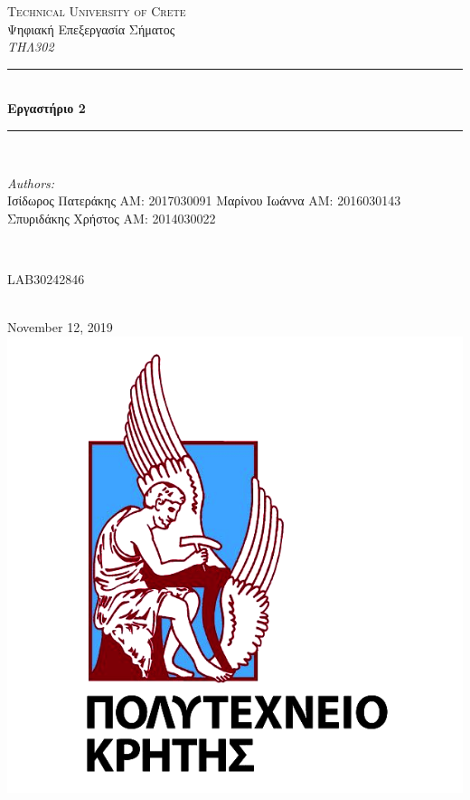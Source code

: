 \documentclass[11pt]{article}
\begin{document}
\begin{titlepage}
    \center
    \textsc{\LARGE Technical University of Crete}\\[2cm] 
    \Large Ψηφιακή Επεξεργασία Σήματος\\
    \emph{ΤΗΛ302}\\[1cm] 
    
    \rule{\linewidth}{0.5mm} \\[0.5cm]
        { \huge \bfseries Εργαστήριο 2}\\[0.5cm]
    \rule{\linewidth}{0.5mm} \\[2.5cm]
    
    \begin{minipage}{0.4\textwidth}
        \begin{flushleft} \large
            \emph{Authors:}\\
                Ισίδωρος Πατεράκης AM: 2017030091
                Μαρίνου Ιωάννα AM: 2016030143
                Σπυριδάκης Χρήστος AM: 2014030022
        \end{flushleft}
    \end{minipage}
    ~
    \begin{minipage}{0.4\textwidth}
        \begin{flushright} \large
            LAB30242846 \\
        \end{flushright}
    \end{minipage}\\[2cm]
    
    {\large November 12, 2019}\\[2cm] 
    \includegraphics[scale=0.5]{TUC.png} 
    \vfill
\end{titlepage}
\end{document}
